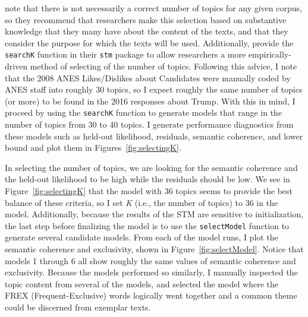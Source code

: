 \documentclass[12pt]{article}
\begin{document}
\begin{appendices}
\begin{refsection}
\textcite{roberts2014stm} note that there is not necessarily a correct number of topics for any given corpus, so they recommend that researchers make this selection based on substantive knowledge that they many have about the content of the texts, and that they consider the purpose for which the texts will be used. Additionally, \textcite{roberts2019stm} provide the \texttt{searchK} function in their \texttt{stm} package to allow researchers a more empirically-driven method of selecting of the number of topics. Following this advice, I note that the 2008 ANES Likes/Dislikes about Candidates were manually coded by ANES staff into roughly 30 topics, so I expect roughly the same number of topics (or more) to be found in the 2016 responses about Trump. With this in mind, I proceed by using the \texttt{searchK} function to generate models that range in the number of topics from 30 to 40 topics. I generate performance diagnostics from these models such as held-out likelihood, residuals, semantic coherence, and lower bound and plot them in Figures~\ref{fig:selectingK}. 

In selecting the number of topics, we are looking for the semantic coherence and the held-out likelihood to be high while the residuals should be low. We see in Figure~\ref{fig:selectingK} that the model with 36 topics seems to provide the best balance of these criteria, so I set \textit{K} (i.e., the number of topics) to 36 in the model. Additionally, because the results of the STM are sensitive to initialization, the last step before finalizing the model is to use the \texttt{selectModel} function to generate several candidate models. From each of the model runs, I plot the semantic coherence and exclusivity, shown in Figure~\ref{fig:selectModel}. Notice that models 1 through 6 all show roughly the same values of semantic coherence and exclusivity. Because the models performed so similarly, I manually inspected the topic content from several of the models, and selected the model where the FREX (Frequent-Exclusive) words logically went together and a common theme could be discerned from exemplar texts. 



\end{refsection}
\end{appendices}
\end{document}
